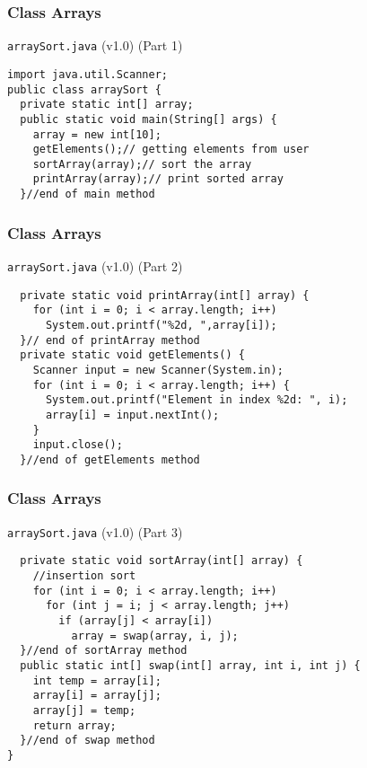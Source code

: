 \documentclass[10pt, compress]{beamer}
\begin{document}
\begin{frame}[fragile]
  \frametitle{Class Arrays}
  \begin{block}{\texttt{arraySort.java} (v1.0) (Part 1)}
    \begin{verbatim}
import java.util.Scanner;
public class arraySort {
  private static int[] array;
  public static void main(String[] args) {
    array = new int[10];
    getElements();// getting elements from user
    sortArray(array);// sort the array
    printArray(array);// print sorted array
  }//end of main method
    \end{verbatim}
  \end{block}
\end{frame}

\begin{frame}[fragile]
  \frametitle{Class Arrays}
  \begin{block}{\texttt{arraySort.java} (v1.0) (Part 2)}
    \begin{verbatim}
  private static void printArray(int[] array) {
    for (int i = 0; i < array.length; i++)
      System.out.printf("%2d, ",array[i]);
  }// end of printArray method
  private static void getElements() {
    Scanner input = new Scanner(System.in);
    for (int i = 0; i < array.length; i++) {
      System.out.printf("Element in index %2d: ", i);
      array[i] = input.nextInt();
    }
    input.close();
  }//end of getElements method
    \end{verbatim}
  \end{block}
\end{frame}

\begin{frame}[fragile]
  \frametitle{Class Arrays}
  \begin{block}{\texttt{arraySort.java} (v1.0) (Part 3)}
    \begin{verbatim}
  private static void sortArray(int[] array) {
    //insertion sort
    for (int i = 0; i < array.length; i++)
      for (int j = i; j < array.length; j++)
        if (array[j] < array[i])
          array = swap(array, i, j);
  }//end of sortArray method
  public static int[] swap(int[] array, int i, int j) {
    int temp = array[i];
    array[i] = array[j];
    array[j] = temp;
    return array;
  }//end of swap method
}

    \end{verbatim}
  \end{block}
\end{frame}
\end{document}

